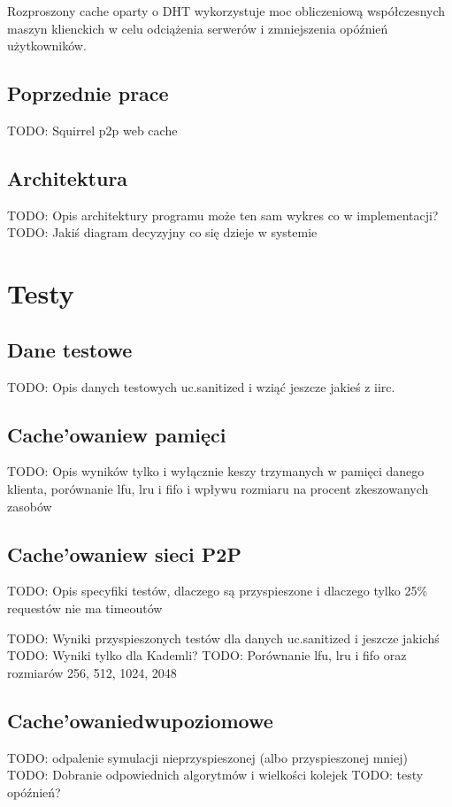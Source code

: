 \documentclass[a4paper,11pt]{scrartcl}
\newcommand{\s}{ }
\newcommand{\kesz}{cache}
\newcommand{\Keszowanie}{Cache'owanie}
\begin{document}
Rozproszony \kesz\s oparty o DHT wykorzystuje moc obliczeniową współczesnych maszyn klienckich w celu odciążenia serwerów i zmniejszenia opóźnień użytkowników.



\subsection{Poprzednie prace}
TODO: Squirrel p2p web cache \cite{iyer2002squirrel}

\subsection{Architektura}
TODO: Opis architektury programu może ten sam wykres co w implementacji?
TODO: Jakiś diagram decyzyjny co się dzieje w systemie

\section{Testy}
\label{sect_tests}

\subsection{Dane testowe}
TODO: Opis danych testowych uc.sanitized i wziąć jeszcze jakieś z iirc.

\subsection{\Keszowanie w pamięci}
TODO: Opis wyników tylko i wyłącznie keszy trzymanych w pamięci danego klienta, porównanie lfu, lru i fifo i wpływu rozmiaru na procent zkeszowanych zasobów

\subsection{\Keszowanie w sieci P2P}
TODO: Opis specyfiki testów, dlaczego są przyspieszone i dlaczego tylko 25\% requestów nie ma timeoutów

TODO: Wyniki przyspieszonych testów dla danych uc.sanitized i jeszcze jakichś
TODO: Wyniki tylko dla Kademli?
TODO: Porównanie lfu, lru i fifo oraz rozmiarów 256, 512, 1024, 2048

\subsection{\Keszowanie dwupoziomowe}
TODO: odpalenie symulacji nieprzyspieszonej (albo przyspieszonej mniej)
TODO: Dobranie odpowiednich algorytmów i wielkości kolejek
TODO: testy opóźnień?
\end{document}
